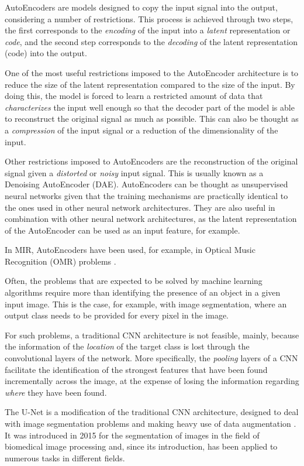 AutoEncoders are models designed to copy the input signal
into the output, considering a number of restrictions. This
process is achieved through two steps, the first corresponds
to the \emph{encoding} of the input into a \emph{latent}
representation or \emph{code}, and the second step
corresponds to the \emph{decoding} of the latent
representation (code) into the output.

One of the most useful restrictions imposed to the
AutoEncoder architecture is to reduce the size of the latent
representation compared to the size of the input. By doing
this, the model is forced to learn a restricted amount of
data that \emph{characterizes} the input well enough so that
the decoder part of the model is able to reconstruct the
original signal as much as possible. This can also be
thought as a \emph{compression} of the input signal or a
reduction of the dimensionality of the input.

Other restrictions imposed to AutoEncoders are the
reconstruction of the original signal given a
\emph{distorted} or \emph{noisy} input signal. This is
usually known as a Denoising AutoEncoder (DAE). AutoEncoders
can be thought as unsupervised neural networks given that
the training mechanisms are practically identical to the
ones used in other neural network architectures. They are
also useful in combination with other neural network
architectures, as the latent representation of the
AutoEncoder can be used as an input feature, for example.

In MIR, AutoEncoders have been used, for example, in Optical
Music Recognition (OMR) problems
\parencite{castellanos2018document}.

Often, the problems that are expected to be solved by
machine learning algorithms require more than identifying
the presence of an object in a given input image. This is
the case, for example, with image segmentation, where an
output class needs to be provided for every pixel in the
image.

For such problems, a traditional CNN architecture is not
feasible, mainly, because the information of the
\emph{location} of the target class is lost through the
convolutional layers of the network. More specifically, the
\emph{pooling} layers of a CNN facilitate the identification
of the strongest features that have been found incrementally
across the image, at the expense of losing the information
regarding \emph{where} they have been found.

The U-Net is a modification of the traditional CNN
architecture, designed to deal with image segmentation
problems and making heavy use of data augmentation
\parencite{ronneberger2015unet}. It was introduced in 2015
for the segmentation of images in the field of biomedical
image processing and, since its introduction, has been
applied to numerous tasks in different fields.

